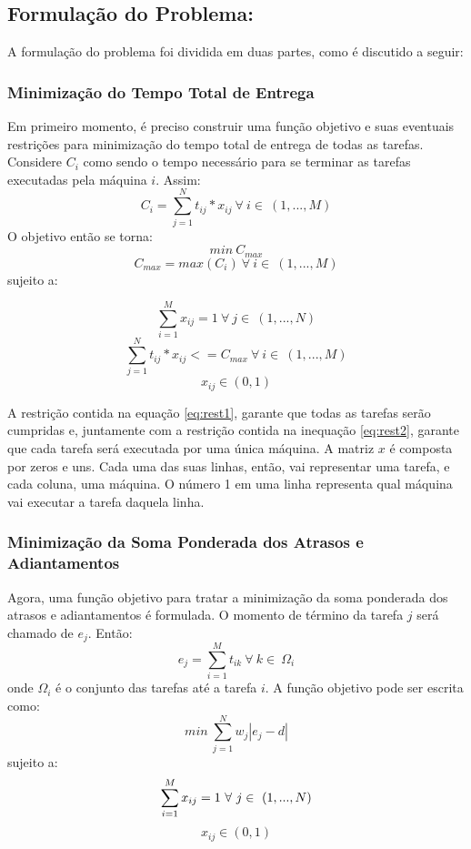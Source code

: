 \documentclass[conference]{IEEEtran}
\begin{document}
\subsection{Formulação do Problema:}
A formulação do problema foi dividida em duas partes, como é discutido a seguir:

\subsubsection{Minimização do Tempo Total de Entrega}
Em primeiro momento, é preciso construir uma função objetivo e suas eventuais restrições para minimização do tempo total de entrega de todas as tarefas. Considere $C_i$ como sendo o tempo necessário para se terminar as tarefas executadas pela máquina $i$. Assim:
\[C_i = \sum_{j=1}^{N}t_{ij}*x_{ij}\ \forall\ i \in\ (1,...,M) \]
O objetivo então se torna:
\[min\ C_{max} \]
\[C_{max} = max(C_i)\ \forall\ i \in\ (1,...,M) \]
sujeito a:

\begin{equation}
	\sum_{i=1}^{M}x_{ij}=1\ \forall\ j \in\ (1,...,N)
	\label{eq:rest1}
\end{equation}
\begin{equation}
	\sum_{j=1}^{N}t_{ij}*x_{ij} <= C_{max}\ \forall\ i \in\
 (1,...,M)
 	\label{eq:rest2}
\end{equation}
\[ x_{ij} \in (0, 1)\]

A restrição contida na equação \ref{eq:rest1}, garante que todas as tarefas serão cumpridas e, juntamente com a restrição contida na inequação \ref{eq:rest2}, garante que cada tarefa será executada por uma única máquina. A matriz $x$ é composta por zeros e uns. Cada uma das suas linhas, então, vai representar uma tarefa, e cada coluna, uma máquina. O número 1 em uma linha representa qual máquina vai executar a tarefa daquela linha.

\subsubsection{Minimização da Soma Ponderada dos Atrasos e Adiantamentos}
Agora, uma função objetivo para tratar a minimização da soma ponderada dos atrasos e adiantamentos é formulada. O momento de término da tarefa $j$ será chamado de $e_j$. Então:
\[e_j = \sum_{i=1}^{M}t_{ik}\ \forall\ k \in\ \Omega_i \]
onde $\Omega_i$ é o conjunto das tarefas até a tarefa $i$. A função objetivo pode ser escrita como:
\[min\ \sum_{j=1}^{N}w_j|e_j-d| \]
sujeito a:
\begin{equation}
\sum_{i=1}^{M}x_{ij}=1\ \forall\ j \in\ (1,...,N)\\
\label{eq:rest3}
\end{equation}
\[x_{ij} \in (0, 1)\]
\end{document}
